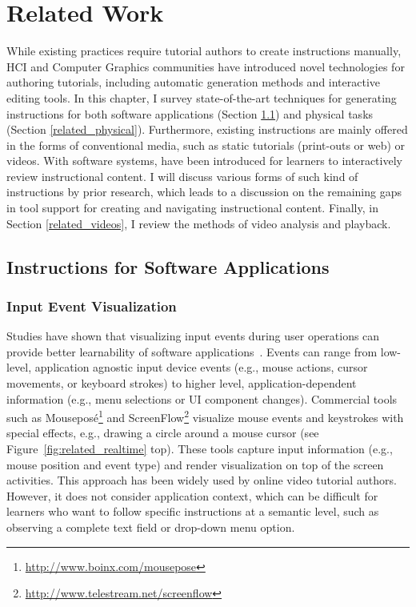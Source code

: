 
\chapter{Related Work}
\label{chapter_related_work}

While existing practices require tutorial authors to create instructions manually, HCI and Computer Graphics communities have introduced novel technologies for authoring tutorials, including automatic generation methods and interactive editing tools.
%
In this chapter, I survey state-of-the-art techniques for generating instructions for both software applications (Section \ref{related_software}) and physical tasks (Section \ref{related_physical}).
%
Furthermore, existing instructions are mainly offered in the forms of conventional media, such as static tutorials (print-outs or web) or videos. With software systems,  have been introduced for learners to interactively review instructional content. I will discuss various forms of such kind of instructions by prior research, which leads to a discussion on the remaining gaps in tool support for creating and navigating instructional content.
%
Finally, in Section \ref{related_videos}, I review the methods of video analysis and playback.


\section{Instructions for Software Applications}
\label{related_software}

\subsection{Input Event Visualization}

Studies have shown that visualizing input events during user operations can provide better learnability of software applications~\cite{Dixon:2010fb}. Events can range from low-level, application agnostic input device events (e.g., mouse actions, cursor movements, or keyboard strokes) to higher level, application-dependent information (e.g., menu selections or UI component changes).
%
Commercial tools such as Mouseposé\footnote{\url{http://www.boinx.com/mousepose}} and ScreenFlow\footnote{\url{http://www.telestream.net/screenflow}} visualize mouse events and keystrokes with special effects, e.g., drawing a circle around a mouse cursor (see Figure~\ref{fig:related_realtime} top). These tools capture input information (e.g., mouse position and event type) and render visualization on top of the screen activities. This approach has been widely used by online video tutorial authors. However, it does not consider application context, which can be difficult for learners who want to follow specific instructions at a semantic level, such as observing a complete text field or drop-down menu option.


